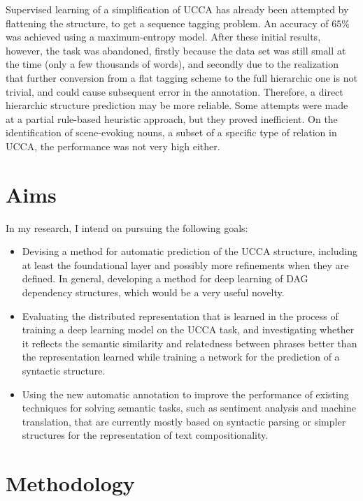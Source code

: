 \documentclass[11pt]{article}
\begin{document}
Supervised learning of a simplification of UCCA has already been attempted by flattening the structure, to get a sequence tagging problem\cite{beka2013thesis}. An accuracy of $65\%$ was achieved using a maximum-entropy model. After these initial results, however, the task was abandoned, firstly because the data set was still small at the time (only a few thousands of words), and secondly due to the realization that further conversion from a flat tagging scheme to the full hierarchic one is not trivial, and could cause subsequent error in the annotation. Therefore, a direct hierarchic structure prediction may be more reliable. Some attempts were made at a partial rule-based heuristic approach, but they proved inefficient. On the identification of scene-evoking nouns, a subset of a specific type of relation in UCCA, the performance was not very high either.



\section{Aims}

In my research, I intend on pursuing the following goals:

\begin{itemize}
  \item Devising a method for automatic prediction of the UCCA structure, including at least the foundational layer and possibly more refinements when they are defined. In general, developing a method for deep learning of DAG dependency structures, which would be a very useful novelty.
  \item Evaluating the distributed representation that is learned in the process of training a deep learning model on the UCCA task, and investigating whether it reflects the semantic similarity and relatedness between phrases better than the representation learned while training a network for the prediction of a syntactic structure.
  \item Using the new automatic annotation to improve the performance of existing techniques for solving semantic tasks, such as sentiment analysis and machine translation, that are currently mostly based on syntactic parsing or simpler structures for the representation of text compositionality.
\end{itemize}



\section{Methodology}
\end{document}
